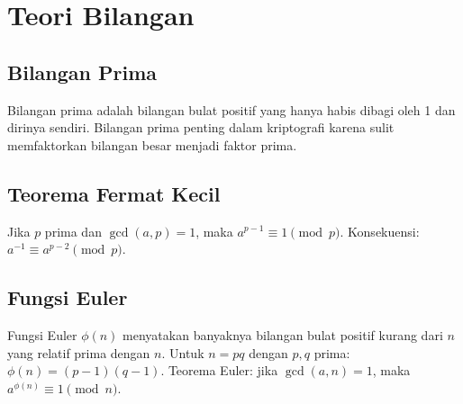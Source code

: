 \section{Teori Bilangan}

\subsection{Bilangan Prima}
Bilangan prima adalah bilangan bulat positif yang hanya habis dibagi oleh 1 dan dirinya sendiri. Bilangan prima penting dalam kriptografi karena sulit memfaktorkan bilangan besar menjadi faktor prima.

\subsection{Teorema Fermat Kecil}
Jika $p$ prima dan $\gcd(a, p) = 1$, maka $a^{p-1} \equiv 1 \pmod{p}$. Konsekuensi: $a^{-1} \equiv a^{p-2} \pmod{p}$.

\subsection{Fungsi Euler}
Fungsi Euler $\phi(n)$ menyatakan banyaknya bilangan bulat positif kurang dari $n$ yang relatif prima dengan $n$. Untuk $n = pq$ dengan $p, q$ prima: $\phi(n) = (p-1)(q-1)$. Teorema Euler: jika $\gcd(a, n) = 1$, maka $a^{\phi(n)} \equiv 1 \pmod{n}$.
